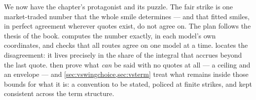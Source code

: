 We now have the chapter's protagonist and its puzzle.  The fair strike
is one market-traded number that the whole smile determines --- and
that fitted smiles, in perfect agreement wherever quotes exist, do not
agree on.  The plan follows the thesis of the book.
 computes the number exactly, in each model's own
coordinates, and checks that all routes agree on one model at a time.
 locates the disagreement: it lives precisely in the
share of the integral that accrues beyond the last quote.
 then prove what \emph{can} be said
with no quotes at all --- a ceiling and an envelope --- and
\cref{sec:vswingchoice,sec:vsterm} treat what remains inside those
bounds for what it is: a convention to be stated, policed at finite
strikes, and kept consistent across the term structure.
